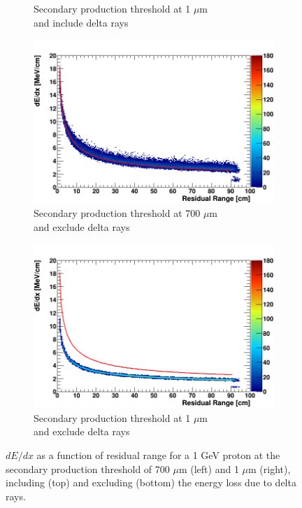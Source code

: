 \begin{figure}[ht!]
\begin{subfigure}[b]{0.495\textwidth}
            \caption{Secondary production threshold at 1 $\mu$m \\ and include delta rays}%
            \label{fig:derr_proton_delta_1}
        \end{subfigure}
        \begin{subfigure}[b]{0.495\textwidth}   
            \centering 
            \includegraphics[width=\textwidth]{derr_proton_only_700um}
            \caption{Secondary production threshold at 700 $\mu$m \\ and exclude delta rays}%
            \label{fig:derr_proton_only_700}
        \end{subfigure}
        \hfill
        \begin{subfigure}[b]{0.495\textwidth}   
            \centering 
            \includegraphics[width=\textwidth]{derr_proton_only_1um}
            \caption{Secondary production threshold at 1 $\mu$m \\ and exclude delta rays}%
            \label{fig:derr_proton_only_1}
        \end{subfigure}
	\caption[Energy-Residual Range Scale of Protons at Different Delta Ray Thresholds]{
	$dE/dx$ as a function of residual range for a 1 GeV proton at the secondary production threshold of 700 $\mu$m (left) and 1 $\mu$m (right), including (top) and excluding (bottom) the energy loss due to delta rays. 
	}
        \label{fig:proton_derr}
\end{figure}

